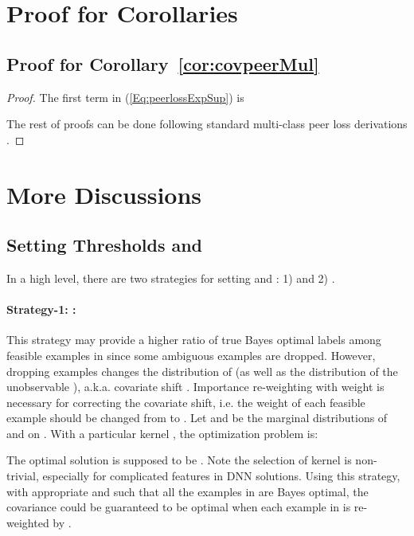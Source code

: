 \documentclass[final]{cvpr}
\begin{document}
\section{Proof for Corollaries}




\subsection{Proof for Corollary~\ref{cor:covpeerMul}}\label{proof:covpeerMul}

\begin{proof}



The first term in (\ref{Eq:peerlossExpSup}) is


The rest of proofs can be done following standard multi-class peer loss derivations \cite{liu2019peer}. 

\end{proof}

\section{More Discussions}

\subsection{Setting Thresholds  and }\label{dis:L}

In a high level, there are two strategies for setting  and : {1)  and 2) }.


\paragraph{Strategy-1: :}
This strategy may provide a higher ratio of true Bayes optimal labels among feasible examples in  since some ambiguous examples are dropped. However, dropping examples changes the distribution of  (as well as the distribution of the unobservable ), a.k.a. covariate shift \cite{huang2007correcting,cheng2017learningdistill}. 
Importance re-weighting with weight  is necessary for correcting the covariate shift, i.e. the weight of each feasible example  should be changed from  to .
Let  and  be the marginal distributions of  and  on .
With a particular kernel , the optimization problem is:

The optimal solution is supposed to be .
Note the selection of kernel  is non-trivial, especially for complicated features \cite{fang2020rethinking} in DNN solutions.
Using this strategy, with appropriate  and  such that all the examples in  are Bayes optimal, the covariance could be guaranteed to be optimal when each example in  is re-weighted by . 
\end{document}
